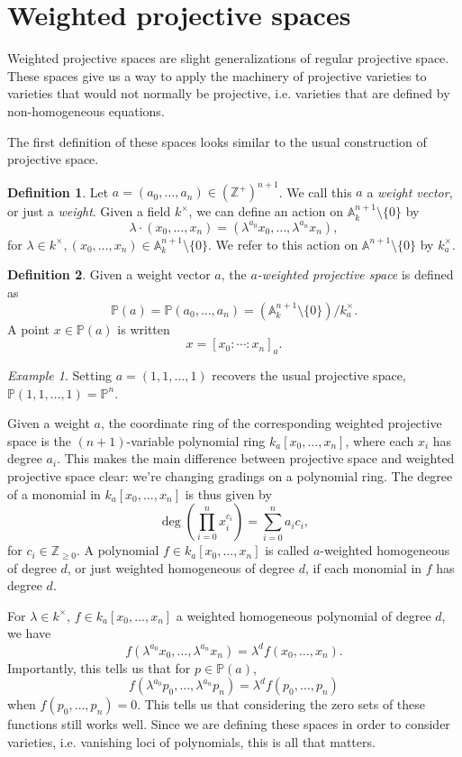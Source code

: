 \documentclass[12pt,twoside]{reedthesis}
\theoremstyle{plain}
\theoremstyle{definition}
\newtheorem{definition}{Definition}[section]
\theoremstyle{remark}
\newtheorem{example}{Example}[section]
\newcommand{\ZZ}{\mathbb{Z}}
\newcommand{\Affine}{\mathbb{A}}
\newcommand{\Proj}{\mathbb{P}}
\begin{document}
\section{Weighted projective spaces}
Weighted projective spaces are slight generalizations of regular projective space. These spaces give us a way to apply the machinery of projective varieties to varieties that would not normally be projective, i.e. varieties that are defined by non-homogeneous equations.

The first definition of these spaces looks similar to the usual construction of projective space.
\begin{definition}
Let $a=(a_0,\ldots,a_n)\in(\ZZ^+)^{n+1}$. We call this $a$ a \emph{weight vector}, or just a \emph{weight}. Given a field $k^\times$, we can define an action on $\Affine^{n+1}_k\setminus\{0\}$ by
\[
\lambda\cdot(x_0,\ldots,x_n)=(\lambda^{a_0}x_0,\ldots,\lambda^{a_n}x_n),
\]
for $\lambda\in k^\times, (x_0,\ldots,x_n)\in\Affine^{n+1}_k\setminus\{0\}$. We refer to this action on $\Affine^{n+1}\setminus\{0\}$ by $k^\times_a$.
\end{definition}
\begin{definition}
Given a weight vector $a$, the \emph{$a$-weighted projective space} is defined as
\[
\Proj(a)=\Proj(a_0,\ldots,a_n)=(\Affine^{n+1}_k\setminus\{0\})/k^\times_a.
\]
A point $x\in\Proj(a)$ is written
\[
x=[x_0:\cdots:x_n]_a.
\]
\end{definition}
\begin{example}
Setting $a=(1,1,\ldots,1)$ recovers the usual projective space, $\Proj(1,1,\ldots,1)=\Proj^n$.
\end{example}
Given a weight $a$, the coordinate ring of the corresponding weighted projective space is the $(n+1)$-variable polynomial ring $k_a[x_0,\ldots,x_n]$, where each $x_i$ has degree $a_i$. This makes the main difference between projective space and weighted projective space clear: we're changing gradings on a polynomial ring. The degree of a monomial in $k_a[x_0,\ldots,x_n]$ is thus given by
\[
\deg\left(\prod_{i=0}^n x_i^{c_i}\right)=\sum_{i=0}^n a_ic_i,
\]
for $c_i\in\ZZ_{\geq0}$. A polynomial $f\in k_a[x_0,\ldots,x_n]$ is called $a$-weighted homogeneous of degree $d$, or just weighted homogeneous of degree $d$, if each monomial in $f$ has degree $d$. 

For $\lambda\in k^\times$, $f\in k_a[x_0,\ldots,x_n]$ a weighted homogeneous polynomial of degree $d$, we have
\[
f(\lambda^{a_0}x_0,\ldots,\lambda^{a_n}x_n)=\lambda^d f(x_0,\ldots,x_n).
\]
Importantly, this tells us that for $p\in\Proj(a)$, 
\[
f(\lambda^{a_0}p_0,\ldots,\lambda^{a_n}p_n)=\lambda^d f(p_0,\ldots,p_n)
\]
when $f(p_0,\ldots,p_n)=0$. This tells us that considering the zero sets of these functions still works well. Since we are defining these spaces in order to consider varieties, i.e. vanishing loci of polynomials, this is all that matters.
\end{document}
